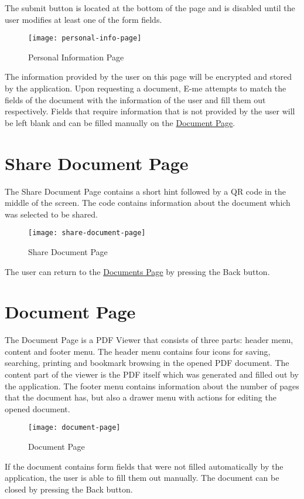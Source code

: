 	The submit button is located at the bottom of the page and is disabled until the user modifies at least one of the form fields.
		\begin{figure}[H]
			\centering
			\texttt{[image: personal-info-page]}
			\caption{Personal Information Page}
		\end{figure}

		The information provided by the user on this page will be encrypted and stored by the application.
		Upon requesting a document, E-me attempts to match the fields of the document with the information of the user and fill them out respectively.
		Fields that require information that is not provided by the user will be left blank and can be filled manually on the \hyperref[document]{Document Page}.

	\section{Share Document Page}\label{shareDocument}

	The Share Document Page contains a short hint followed by a QR code in the middle of the screen.
	The code contains information about the document which was selected to be shared.
		\begin{figure}[H]
			\centering
			\texttt{[image: share-document-page]}
			\caption{Share Document Page}
		\end{figure}
	The user can return to the \hyperref[documents]{Documents Page} by pressing the Back button.

	\section{Document Page}\label{document}

	The Document Page is a PDF Viewer that consists of three parts: header menu, content and footer menu.
	The header menu contains four icons for saving, searching, printing and bookmark browsing in the opened PDF document.
	The content part of the viewer is the PDF itself which was generated and filled out by the application.
	The footer menu contains information about the number of pages that the document has, but also a drawer menu with actions for editing the opened document.
		\begin{figure}[H]
			\centering
			\texttt{[image: document-page]}
			\caption{Document Page}
		\end{figure}

	If the document contains form fields that were not filled automatically by the application, the user is able to fill them out manually.
	The document can be closed by pressing the Back button.